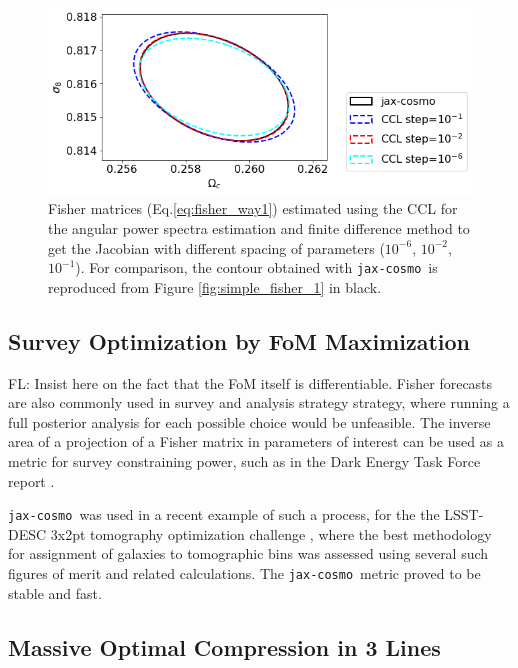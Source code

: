 \documentclass[twocolumn,twocolappendix,nofootinbib,iop]{openjournal}
\newcommand{\FrL}[1]{{\color{cyan}FL: #1}}
\newcommand{\jaxcosmo}{\texttt{jax-cosmo}}
\begin{document}
\begin{figure}
    \centering
    \includegraphics[width=\columnwidth]{figures/simple_fisher_2.png}
    \caption{Fisher matrices (Eq.\ref{eq:fisher_way1}) estimated using the CCL for the angular power spectra estimation and finite difference method to get the Jacobian  with different spacing of parameters ($10^{-6}$, $10^{-2}$, $10^{-1}$). For comparison, the contour obtained with \jaxcosmo\ is reproduced from Figure \ref{fig:simple_fisher_1} in black.} 
    \label{fig:simple_fisher_2}
\end{figure}

%
\subsection{Survey Optimization by FoM Maximization}
\label{sec-FOM-optimisation}
\FrL{Insist here on the fact that the FoM itself is differentiable.}
Fisher forecasts are also commonly used in survey and analysis strategy strategy, where running a full posterior analysis for each possible choice would be unfeasible. The inverse area of a projection of a Fisher matrix in parameters of interest can be used as a metric for survey constraining power, such as in the Dark Energy Task Force report \citep{2006astro.ph..9591A}.

\jaxcosmo\ was used in a recent example of such a process, for the  the LSST-DESC 3x2pt tomography optimization challenge \citep{2021OJAp....4E..13Z}, where the best methodology for assignment of galaxies to tomographic bins was assessed using several such figures of merit and related calculations. The \jaxcosmo\ metric proved to be stable and fast.



\subsection{Massive Optimal Compression in 3 Lines}
\end{document}
